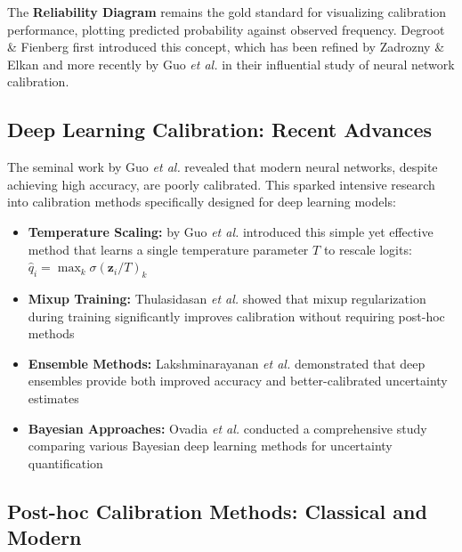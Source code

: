 \documentclass[12pt, a4paper]{article}
\begin{document}
The \textbf{Reliability Diagram} remains the gold standard for visualizing calibration performance, plotting predicted probability against observed frequency.  Degroot \& Fienberg \cite{degroot1983comparison} first introduced this concept, which has been refined by Zadrozny \& Elkan \cite{zadrozny2001obtaining} and more recently by Guo \emph{et al.} \cite{guo2017calibration} in their influential study of neural network calibration.

\subsection{Deep Learning Calibration: Recent Advances}

The seminal work by Guo \emph{et al.} \cite{guo2017calibration} revealed that modern neural networks, despite achieving high accuracy, are poorly calibrated. This sparked intensive research into calibration methods specifically designed for deep learning models:

\begin{itemize}
    \item \textbf{Temperature Scaling:} by Guo \emph{et al.} \cite{guo2017calibration} introduced this simple yet effective method that learns a single temperature parameter $T$ to rescale logits: $\hat{q}_i = \max_k \sigma(\mathbf{z}_i/T)_k$
    
    \item \textbf{Mixup Training:} Thulasidasan \emph{et al.} \cite{thulasidasan2019mixup} showed that mixup regularization during training significantly improves calibration without requiring post-hoc methods
    
    \item \textbf{Ensemble Methods:} Lakshminarayanan \emph{et al.} \cite{lakshminarayanan2017simple} demonstrated that deep ensembles provide both improved accuracy and better-calibrated uncertainty estimates
    
    \item \textbf{Bayesian Approaches:} Ovadia \emph{et al.} \cite{ovadia2019can} conducted a comprehensive study comparing various Bayesian deep learning methods for uncertainty quantification
\end{itemize}

\subsection{Post-hoc Calibration Methods: Classical and Modern}
\end{document}
